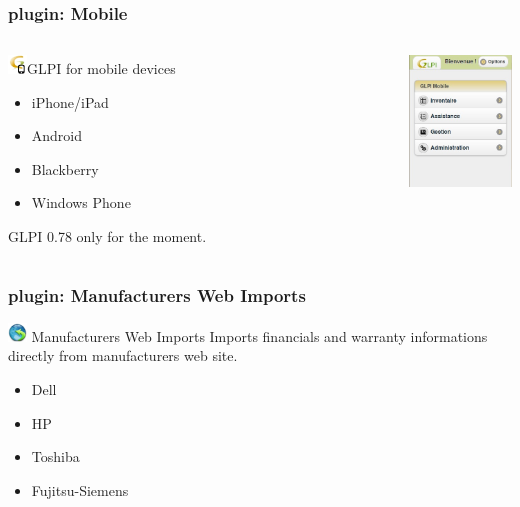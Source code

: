 \documentclass{beamer}
\begin{document}
\begin{frame}
    \frametitle{plugin: Mobile}
 \begin{columns}
 \begin{column}{0.55\textwidth}
    \begin{block}{\includegraphics[height=0.5cm]{./pics/plugins/mobile.jpg}GLPI for mobile devices}
        \begin{itemize}
            \item iPhone/iPad
            \item Android
            \item Blackberry
            \item Windows Phone
        \end{itemize}
        GLPI 0.78 only for the moment.
    \end{block}

 \end{column}
 \begin{column}{0.1\textwidth}
 \end{column}
    \includegraphics[height=3.5cm]{./pics/mobile/central.jpg}

\end{columns}
\end{frame}

\begin{frame}
    \frametitle{plugin: Manufacturers Web Imports}

    \begin{block}{\includegraphics[height=0.5cm]{./pics/plugins/manufacturer.jpg} Manufacturers Web Imports}
        Imports financials and warranty informations directly from manufacturers web site.
        \begin{itemize}
            \item Dell
            \item HP
            \item Toshiba
            \item Fujitsu-Siemens
        \end{itemize}
    \end{block}

\end{frame}
\end{document}
